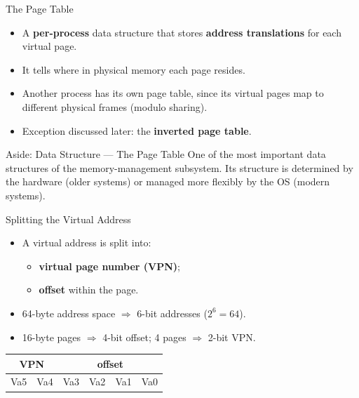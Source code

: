 \begin{frame}{The Page Table}

\begin{itemize}
    \item A \textbf{per-process} data structure that stores
          \textbf{address translations} for each virtual page.
    \item It tells where in physical memory each page resides.
    \item Another process has its own page table, since its virtual pages
          map to different physical frames (modulo sharing).
    \item Exception discussed later: the \textbf{inverted page table}.
\end{itemize}

\begin{block}{Aside: Data Structure --- The Page Table}
One of the most important data structures of the memory-management subsystem.
Its structure is determined by the hardware (older systems) or managed more
flexibly by the OS (modern systems).
\end{block}

\end{frame}

\begin{frame}{Splitting the Virtual Address}

\begin{itemize}
    \item A virtual address is split into:
    \begin{itemize}
        \item \textbf{virtual page number (VPN)};
        \item \textbf{offset} within the page.
    \end{itemize}
    \item 64-byte address space $\Rightarrow$ 6-bit addresses ($2^6 = 64$).
    \item 16-byte pages $\Rightarrow$ 4-bit offset; 4 pages $\Rightarrow$ 2-bit VPN.
\end{itemize}

\begin{center}
\renewcommand{\arraystretch}{1.3}
\begin{tabular}{|c|c|c|c|c|c|}
\multicolumn{2}{c}{VPN} & \multicolumn{4}{c}{offset} \\
\hline
Va5 & Va4 & Va3 & Va2 & Va1 & Va0 \\
\hline
\end{tabular}
\end{center}

\end{frame}

